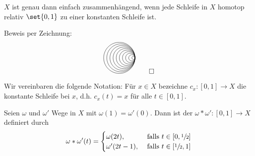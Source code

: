 \begin{lemma}[{name=[Charakterisierung von einfach zusammenhängend mittels Homotopie]},label=lem:einf-zsmh-homotopie]
	$X$ ist genau dann einfach zusammenhängend, wenn jede Schleife in $X$ homotop relativ $\set{0,1}$ zu einer konstanten Schleife ist.
\end{lemma}
\begin{beweis}
	Beweis per Zeichnung:
	\[
		\begin{tikzpicture}[scale=0.8]
			\foreach \r in {0.1, 0.2,...,1}{
				\draw (0,0) arc (0:360:\r); 
			}
		\end{tikzpicture}\qedhere
	\]
\end{beweis}

Wir vereinbaren die folgende Notation: 
Für $x \in X$ bezeichne $c_x \colon [0,1] \to X$ die konstante Schleife bei $x$, d.h. $c_x(t)= x $ für alle $ t \in [0,1]$.

\begin{definition}[{name=[Kompositionsweg]}]
	Seien $\omega$ und $\omega'$ Wege in $X$ mit $\omega(1)= \omega'(0)$. 
	Dann ist der  $\omega * \omega' \colon [0,1] \to X$ definiert durch 
	\[
		\omega * \omega' (t) = \begin{cases}
			\omega(2 t), &\text{ falls }t \in [0, \sfrac{1}{2}]\\
			\omega'(2t -1), &\text{ falls } t \in [\sfrac{1}{2},1]
		\end{cases}
	\]
\end{definition}


